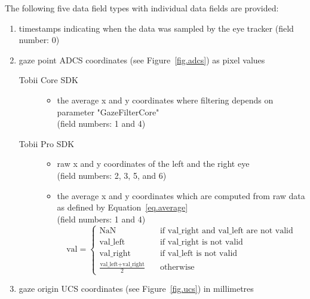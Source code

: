 \documentclass[a4paper,oneside]{book}
\begin{document}
The following five data field types with individual data fields are provided:
\begin{enumerate}
    \item timestamps indicating when the data was sampled by the eye tracker (field number: 0)
    \item gaze point ADCS coordinates (see Figure~\ref{fig.adcs}) as pixel values
        \begin{description}
            \item[Tobii Core SDK] \hfill
                \begin{itemize}
                    \item the average x and y coordinates where filtering depends on parameter "GazeFilterCore"\\
                        (field numbers: 1 and 4)
                \end{itemize}
            \item[Tobii Pro SDK] \hfill
                \begin{itemize}
                    \item raw x and y coordinates of the left and the right eye\\
                        (field numbers: 2, 3, 5, and 6)
                    \item the average x and y coordinates which are computed from raw data as defined by Equation~\ref{eq.average}\\
                        (field numbers: 1 and 4)
\begin{equation}
    \label{eq.average}
    \text{val} =
        \begin{cases}
            \text{NaN}                                      & \quad \text{if val\_right and val\_left are not valid}\\
            \text{val\_left}                                & \quad \text{if val\_right is not valid}\\
            \text{val\_right}                               & \quad \text{if val\_left is not valid}\\
            \frac{\text{val\_left} + \text{val\_right}}{2}  & \quad \text{otherwise}
        \end{cases}
\end{equation}
                \end{itemize}
        \end{description}
    \item gaze origin UCS coordinates (see Figure~\ref{fig.ucs}) in millimetres

\end{enumerate}
\end{document}

